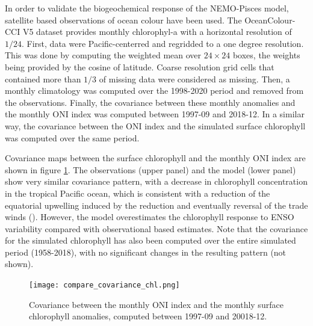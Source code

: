 In order to validate the biogeochemical response of the NEMO-Pisces model, satellite based observations of ocean colour \citep{sathyendranathOceanColourTimeSeries2019} have been used. The OceanColour-CCI V5 dataset provides monthly chlorophyl-a with a horizontal resolution of $1/24$\degree . First, data were Pacific-centerred and regridded to a one degree resolution. This was done by computing the weighted mean over $24 \times 24$ boxes, the weights being provided by the cosine of latitude. Coarse resolution grid cells that contained more than $1/3$ of missing data were considered as missing. Then, a monthly climatology was computed over the 1998-2020 period and removed from the observations. Finally, the covariance between these monthly anomalies and the monthly ONI index was computed between 1997-09 and 2018-12.  In a similar way, the covariance between the ONI index and the simulated surface chlorophyll was computed over the same period.

Covariance maps between the surface chlorophyll and the monthly ONI index are shown in figure \ref{fig:chl-cov}. The observations (upper panel) and the model (lower panel) show very similar covariance pattern, with a decrease in chlorophyll concentration in the tropical Pacific ocean, which is consistent with a reduction of the equatorial upwelling induced by the reduction and eventually reversal of the trade winds (). However, the model overestimates the chlorophyll response to ENSO variability compared with observational based estimates. Note that the covariance for the simulated chlorophyll has also been computed over the entire simulated period (1958-2018), with no significant changes in the resulting pattern (not shown). \\

\begin{figure}[h!]
	\centering
	\texttt{[image: compare\_covariance\_chl.png]}
	\caption{Covariance between the monthly ONI index and the monthly surface chlorophyll anomalies, computed between 1997-09 and 20018-12.}
	\label{fig:chl-cov}
\end{figure}



